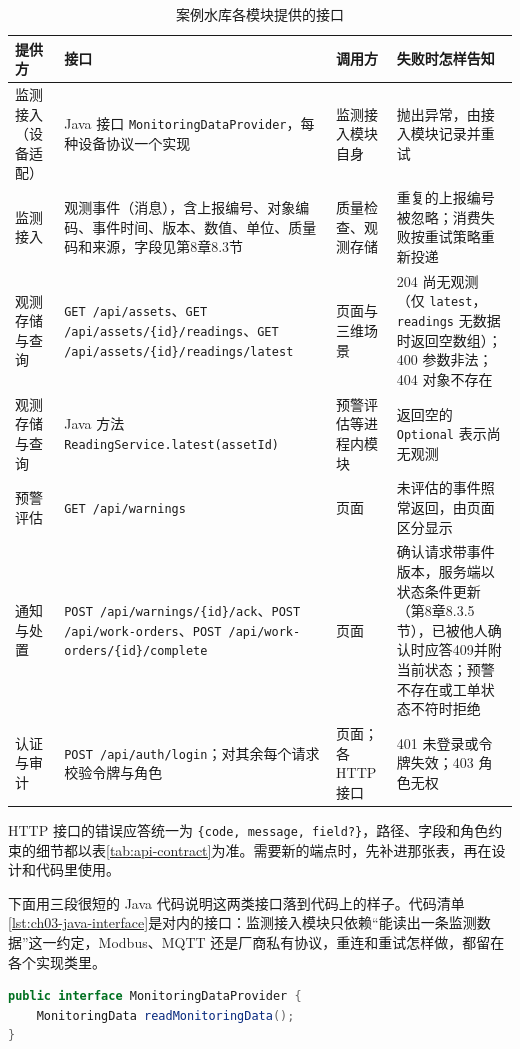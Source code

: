\begin{table}[htbp]
\centering
\caption{案例水库各模块提供的接口}
\label{tab:ch03-module-interfaces}
\begin{tabular}{p{2.2cm}p{5.0cm}p{2.2cm}p{4.0cm}}
\toprule
提供方 & 接口 & 调用方 & 失败时怎样告知 \\
\midrule
监测接入（设备适配） & Java 接口 \texttt{Monitoring}\allowbreak\texttt{DataProvider}，每种设备协议一个实现 & 监测接入模块自身 & 抛出异常，由接入模块记录并重试 \\
监测接入 & 观测事件（消息），含上报编号、对象编码、事件时间、版本、数值、单位、质量码和来源，字段见第8章8.3节 & 质量检查、观测存储 & 重复的上报编号被忽略；消费失败按重试策略重新投递 \\
观测存储与查询 & \texttt{GET /api/assets}、\texttt{GET /api/assets/}\allowbreak\texttt{\{id\}/readings}、\texttt{GET /api/assets/}\allowbreak\texttt{\{id\}/readings/latest} & 页面与三维场景 & 204 尚无观测（仅 \texttt{latest}，\texttt{readings} 无数据时返回空数组）；400 参数非法；404 对象不存在 \\
观测存储与查询 & Java 方法 \texttt{ReadingService.}\allowbreak\texttt{latest(assetId)} & 预警评估等进程内模块 & 返回空的 \texttt{Optional} 表示尚无观测 \\
预警评估 & \texttt{GET /api/warnings} & 页面 & 未评估的事件照常返回，由页面区分显示 \\
通知与处置 & \texttt{POST /api/warnings/}\allowbreak\texttt{\{id\}/ack}、\texttt{POST /api/work-orders}、\texttt{POST /api/work-orders/}\allowbreak\texttt{\{id\}/complete} & 页面 & 确认请求带事件版本，服务端以状态条件更新（第8章8.3.5节），已被他人确认时应答409并附当前状态；预警不存在或工单状态不符时拒绝 \\
认证与审计 & \texttt{POST /api/auth/login}；对其余每个请求校验令牌与角色 & 页面；各 HTTP 接口 & 401 未登录或令牌失效；403 角色无权 \\
\bottomrule
\end{tabular}
\end{table}

HTTP 接口的错误应答统一为 \texttt{\{code, message, field?\}}，路径、字段和角色约束的细节都以表\ref{tab:api-contract}为准。需要新的端点时，先补进那张表，再在设计和代码里使用。

下面用三段很短的 Java 代码说明这两类接口落到代码上的样子。代码清单\ref{lst:ch03-java-interface}是对内的接口：监测接入模块只依赖“能读出一条监测数据”这一约定，Modbus、MQTT 还是厂商私有协议，重连和重试怎样做，都留在各个实现类里。

\begin{lstlisting}[label={lst:ch03-java-interface},language=Java,caption={监测数据提供接口}]
public interface MonitoringDataProvider {
    MonitoringData readMonitoringData();
}
\end{lstlisting}


